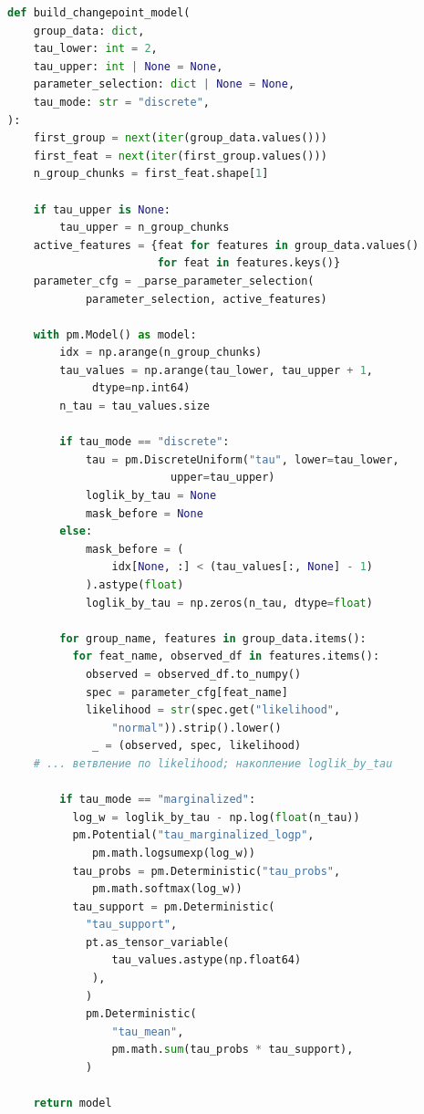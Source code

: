 \documentclass[14pt]{mmcs_article}
\begin{document}
\begin{lstlisting}[language=Python, caption={Каркас \texttt{build\_changepoint\_model}: режимы $\tau$ и маргинализация (прочие ветви правдоподобия опущены)}, label=app-lst:bayes-changepoint]
def build_changepoint_model(
    group_data: dict,
    tau_lower: int = 2,
    tau_upper: int | None = None,
    parameter_selection: dict | None = None,
    tau_mode: str = "discrete",
):
    first_group = next(iter(group_data.values()))
    first_feat = next(iter(first_group.values()))
    n_group_chunks = first_feat.shape[1]

    if tau_upper is None:
        tau_upper = n_group_chunks
    active_features = {feat for features in group_data.values()
                       for feat in features.keys()}
    parameter_cfg = _parse_parameter_selection(
    		parameter_selection, active_features)

    with pm.Model() as model:
        idx = np.arange(n_group_chunks)
        tau_values = np.arange(tau_lower, tau_upper + 1,
        	 dtype=np.int64)
        n_tau = tau_values.size

        if tau_mode == "discrete":
            tau = pm.DiscreteUniform("tau", lower=tau_lower,
            			 upper=tau_upper)
            loglik_by_tau = None
            mask_before = None
        else:
            mask_before = (
                idx[None, :] < (tau_values[:, None] - 1)
            ).astype(float)
            loglik_by_tau = np.zeros(n_tau, dtype=float)

        for group_name, features in group_data.items():
          for feat_name, observed_df in features.items():
            observed = observed_df.to_numpy()
            spec = parameter_cfg[feat_name]
            likelihood = str(spec.get("likelihood", 
            	"normal")).strip().lower()
             _ = (observed, spec, likelihood)
    # ... ветвление по likelihood; накопление loglik_by_tau

        if tau_mode == "marginalized":
          log_w = loglik_by_tau - np.log(float(n_tau))
          pm.Potential("tau_marginalized_logp",
          	 pm.math.logsumexp(log_w))
          tau_probs = pm.Deterministic("tau_probs",
          	 pm.math.softmax(log_w))
          tau_support = pm.Deterministic(
            "tau_support",
            pt.as_tensor_variable(
                tau_values.astype(np.float64)
             ),
            )
            pm.Deterministic(
                "tau_mean",
                pm.math.sum(tau_probs * tau_support),
            )

    return model
\end{lstlisting}
\end{document}
